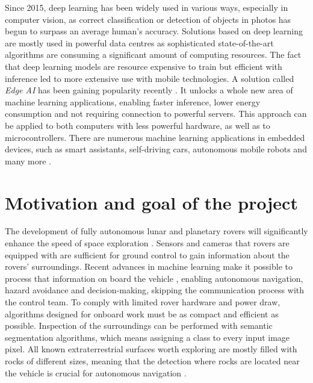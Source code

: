 \documentclass[a4paper,twoside,12pt]{book}
\begin{document}
Since 2015, deep learning has been widely used in various ways, especially in computer vision, as correct classification or detection of objects in photos has begun to surpass an average human's accuracy. Solutions based on deep learning are mostly used in powerful data centres as sophisticated state-of-the-art algorithms are consuming a significant amount of computing resources. The fact that deep learning models are resource expensive to train but efficient with inference led to more extensive use with mobile technologies. A solution called \emph{Edge AI} has been gaining popularity recently \cite{mahdavinejad2018machine}. It unlocks a whole new area of machine learning applications, enabling faster inference, lower energy consumption and not requiring connection to powerful servers. This approach can be applied to both computers with less powerful hardware, as well as to microcontrollers. There are numerous machine learning applications in embedded devices, such as smart assistants, self-driving cars, autonomous mobile robots and many more \cite{merenda2020edge}.



\section{Motivation and goal of the project}
The development of fully autonomous lunar and planetary rovers will significantly enhance the speed of space exploration \cite{bajracharya2008autonomy}. Sensors and cameras that rovers are equipped with are sufficient for ground control to gain information about the rovers' surroundings. Recent advances in machine learning make it possible to process that information on board the vehicle \cite{vitulli2022chime}, enabling autonomous navigation, hazard avoidance and decision-making, skipping the communication process with the control team. To comply with limited rover hardware and power draw, algorithms designed for onboard work must be as compact and efficient as possible. Inspection of the surroundings can be performed with semantic segmentation algorithms, which means assigning a class to every input image pixel. All known extraterrestrial surfaces worth exploring are mostly filled with rocks of different sizes, meaning that the detection where rocks are located near the vehicle is crucial for autonomous navigation \cite{7119022}.
\end{document}
